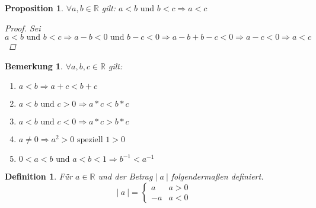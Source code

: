 \documentclass[a4paper,titlepage,oneside]{article}
\def\R{\ensuremath{\mathbb{R}} }
\def\fa{\ensuremath{\forall}}
\newcommand{\abs}[1]{\ensuremath{\left|\:#1\:\right|}}
\theoremstyle{thmstyle}
\newtheorem{prop}[satz]{Proposition}
\newtheorem{defi}[satz]{Definition}
\newtheorem{bem}[satz]{Bemerkung}
\begin{document}
\begin{prop}
\(\fa a, b \in \R \) gilt: \(a < b \text{ und } b < c \Rightarrow a < c\)
\begin{proof}
Sei \( a < b \text{ und } b < c \Rightarrow a - b < 0  \text{ und } b - c < 0 \Rightarrow a - b + b - c < 0 \Rightarrow a - c < 0 \Rightarrow a < c\)
\end{proof}
\end{prop}

\begin{bem}
\(\fa a, b, c \in \R\) gilt:
\begin{enumerate}[label=\alph*)]
	\item \(a < b \Rightarrow a + c < b + c\)
	\item \(a < b \text{ und } c > 0 \Rightarrow a * c < b * c\)
	\item \(a < b \text{ und } c < 0 \Rightarrow a * c > b * c\)
	\item \(a \ne 0 \Rightarrow a^2 > 0 \text{ speziell } 1 > 0\)
	\item \(0 < a < b \text{ und } a < b < 1 \Rightarrow b^{-1} < a^{-1}\)
\end{enumerate}
\end{bem}

\begin{defi}
Für \(a \in \R\) und der Betrag \abs{a} folgendermaßen definiert. 
\[\abs{a} = \begin{cases}
		 a 	& a > 0\\
		-a 	& a < 0  \end{cases}\]
\end{defi}
\end{document}
